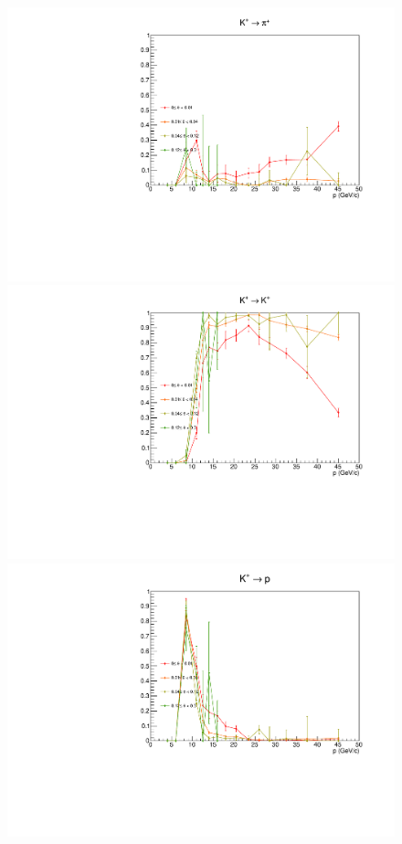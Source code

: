 \begin{figure}[!p]
  \centering
	\includegraphics[scale=0.38]{./gfx/Kp_pi_less.pdf}
  \includegraphics[scale=0.38]{./gfx/Kp_K_less.pdf}
  \includegraphics[scale=0.38]{./gfx/Kp_p_less.pdf}

\end{figure}
